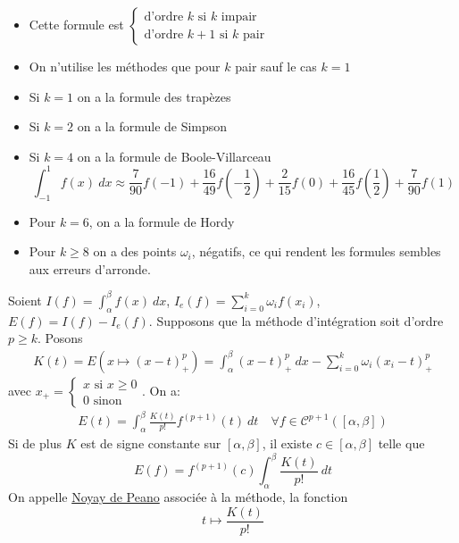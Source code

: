 \begin{remark}
    \begin{itemize}
        \item Cette formule est $\begin{cases}
           \text{d'ordre } k \text{ si }  k \text{ impair}\\
           \text{d'ordre } k+1 \text{ si } k \text{ pair}
           \end{cases}$ 
       \item On n'utilise les méthodes que pour $k$ pair sauf le cas  $k = 1$
       \item Si  $k=1$ on a la formule des trapèzes
       \item Si  $k=2$ on a la formule de Simpson
       \item Si  $k=4$ on a la formule de Boole-Villarceau
            \[
           \int_{{-1}}^{{1}} {f(x)} \: d{x} \approx \frac{7}{90}f(-1) + \frac{16}{49}f(-\frac{1}{2}) + \frac{2}{15}f(0) + \frac{16}{45}f(\frac{1}{2}) + \frac{7}{90}f(1)
           \] 
       \item Pour $k=6$, on a la formule de Hordy
       \item Pour  $k\ge8$ on a des points $\omega_i$, négatifs, ce qui rendent les formules sembles aux erreurs d'arronde.
\end{itemize}
\end{remark}
\begin{theorem}
    Soient  $I(f) = \int_{{\alpha}}^{{\beta}} {f(x)} \: d{x} $, $I_e(f) = \sum_{i=0}^{k} \omega_if(x_i)$, $E(f) = I(f) - I_e(f)$. Supposons que la méthode d'intégration soit d'ordre $p \ge k$. Posons
    \begin{align*}
        K(t) = E(x \mapsto (x - t)^{p}_+) = \int_{{\alpha}}^{{\beta}} {(x - t)^{p}_+} \: d{x} - \sum_{i=0}^{k} \omega_i(x_i - t)^{p}_+
    \end{align*}
    avec $x_+ = \begin{cases}
        x \text{ si } x \ge 0 \\
        0 \text{ sinon}
    \end{cases}$. On a:
    \begin{align*}
        E(t) = \int_{{\alpha}}^{{\beta}} {\frac{K(t)}{p!}f^{(p+1)}(t)} \: d{t} \quad \forall f \in \mathcal{C}^{p+1}([\alpha, \beta])
    \end{align*}
    Si de plus $K$ est de signe constante sur $[\alpha, \beta]$, il existe  $c \in [\alpha, \beta]$ telle que
     \[
         E(f) = f^{(p+1)}(c)\int_{{\alpha}}^{{\beta}} {\frac{K(t)}{p!}} \: d{t} {}
    \] 
    On appelle \underline{Noyay de Peano} associée à la méthode, la fonction
    \[
    t \mapsto \frac{K(t)}{p!}
    \] 
\end{theorem}
